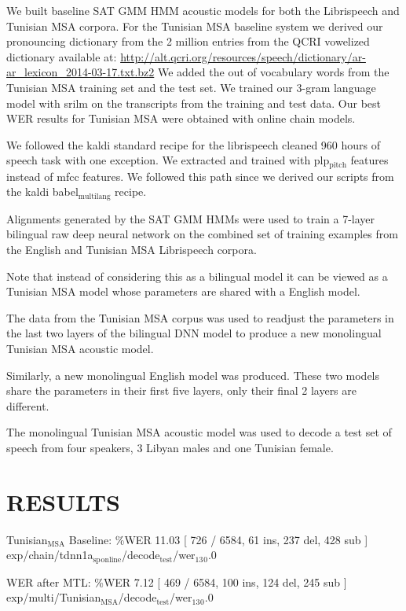 \documentclass[11pt]{article}
\begin{document}
We built baseline SAT GMM HMM acoustic models for both the Librispeech and Tunisian MSA corpora.
For the Tunisian MSA baseline system we derived our pronouncing dictionary from the 2 million entries from the QCRI vowelized dictionary available at:
\url{http://alt.qcri.org/resources/speech/dictionary/ar-ar_lexicon_2014-03-17.txt.bz2}
We added the out of vocabulary words from the Tunisian MSA training set and the test set. 
We trained our 3-gram language model with srilm on the transcripts from the training and test data. 
Our best WER results for Tunisian MSA were obtained with online chain models.

We followed the kaldi standard recipe for the librispeech cleaned 960 hours of speech task with one exception. 
We extracted and trained with plp$_{\text{pitch}}$ features instead of mfcc features. 
We followed this path since we derived our scripts from the kaldi babel$_{\text{multilang}}$ recipe. 

Alignments generated by the  SAT GMM HMMs were used to train a 7-layer bilingual raw deep neural network  on the combined set of training examples from the English and Tunisian MSA Librispeech  corpora.

Note that instead of considering this as a bilingual model it can be viewed as a Tunisian MSA model whose parameters are shared with a English model. 

The data from the Tunisian MSA corpus was used to readjust the parameters in the last two layers of the bilingual DNN model to produce a new monolingual Tunisian MSA  acoustic model. 

Similarly, a new monolingual English model was produced. These two models share the parameters in their first five layers, only their final 2 layers are different.

The monolingual Tunisian MSA acoustic model was used to decode a test set of speech from four speakers, 3 Libyan males and one Tunisian female.

\section{RESULTS}
\label{sec-5}

Tunisian$_{\text{MSA}}$ Baseline:
\%WER 11.03 [ 726 / 6584, 61 ins, 237 del, 428 sub ] exp/chain/tdnn1a$_{\text{sp}}$$_{\text{online}}$/decode$_{\text{test}}$/wer$_{\text{13}}$$_{\text{0}}$.0

WER after MTL:
\%WER 7.12 [ 469 / 6584, 100 ins, 124 del, 245 sub ] exp/multi/Tunisian$_{\text{MSA}}$/decode$_{\text{test}}$/wer$_{\text{13}}$$_{\text{0}}$.0
\end{document}
